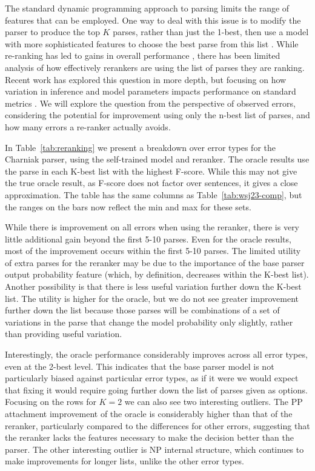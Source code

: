The standard dynamic programming approach to parsing limits the range of features that can be employed.
One way to deal with this issue is to modify the parser to produce the top $K$ parses, rather than just the 1-best, then use a model with more sophisticated features to choose the best parse from this list \parencite{collins:00}.
While re-ranking has led to gains in overall performance \parencite{Charniak-Johnson:2005}, there has been limited analysis of how effectively rerankers are using the list of parses they are ranking.
Recent work has explored this question in more depth, but focusing on how variation in inference and model parameters impacts performance on standard metrics \parencite{huang:08a,Ng-etal:2010,Auli-Lopez:2011,Ng-Curran:2012}.
We will explore the question from the perspective of observed errors, considering the potential for improvement using only the n-best list of parses, and how many errors a re-ranker actually avoids.

In Table~\ref{tab:reranking} we present a breakdown over error types for the
Charniak parser, using the self-trained model and reranker.  The oracle results
use the parse in each K-best list with the highest F-score.  While this may not
give the true oracle result, as F-score does not factor over sentences, it
gives a close approximation.  The table has the same columns as
Table~\ref{tab:wsj23-comp}, but the ranges on the bars now reflect the min and
max for these sets.

\begin{landscape}

\end{landscape}

While there is improvement on all errors when using the reranker, there is very
little additional gain beyond the first 5-10 parses.  Even for the oracle
results, most of the improvement occurs within the first 5-10 parses.  The
limited utility of extra parses for the reranker may be due to the importance
of the base parser output probability feature (which, by definition, decreases
within the K-best list).
Another possibility is that there is less useful variation further down the K-best list.
The utility is higher for the oracle, but we do not see greater improvement further down the list because those parses will be combinations of a set of variations in the parse that change the model probability only slightly, rather than providing useful variation.

Interestingly, the oracle performance considerably improves across all error types, even at the 2-best level.
This indicates that the base parser model is not particularly biased against particular error types, as if it were we would expect that fixing it would require going further down the list of parses given as options.
Focusing on the rows for $K=2$ we
can also see two interesting outliers.  The PP attachment improvement of the
oracle is considerably higher than that of the reranker, particularly compared
to the differences for other errors, suggesting that the reranker lacks the
features necessary to make the decision better than the parser.  The other
interesting outlier is NP internal structure, which continues to make
improvements for longer lists, unlike the other error types.

